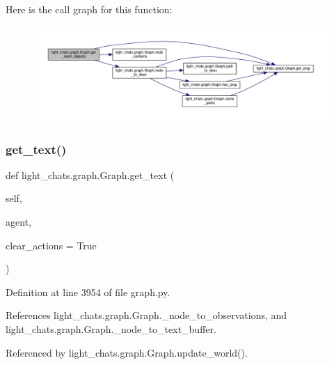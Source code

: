 Here is the call graph for this function\+:
\nopagebreak
\begin{figure}[H]
\begin{center}
\leavevmode
\includegraphics[width=350pt]{classlight__chats_1_1graph_1_1Graph_ad078aab1d28474ac43e8b58ba0fb586b_cgraph}
\end{center}
\end{figure}
\mbox{\label{classlight__chats_1_1graph_1_1Graph_a63268fea99420b5cb83436499cd0676b}} 
\subsubsection{\texorpdfstring{get\+\_\+text()}{get\_text()}}
{\footnotesize\ttfamily def light\+\_\+chats.\+graph.\+Graph.\+get\+\_\+text (\begin{DoxyParamCaption}\item[{}]{self,  }\item[{}]{agent,  }\item[{}]{clear\+\_\+actions = {\ttfamily True} }\end{DoxyParamCaption})}



Definition at line 3954 of file graph.\+py.



References light\+\_\+chats.\+graph.\+Graph.\+\_\+node\+\_\+to\+\_\+observations, and light\+\_\+chats.\+graph.\+Graph.\+\_\+node\+\_\+to\+\_\+text\+\_\+buffer.



Referenced by light\+\_\+chats.\+graph.\+Graph.\+update\+\_\+world().

